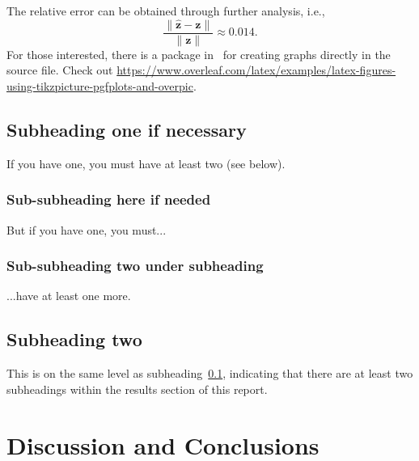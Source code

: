 \documentclass[a4paper]{article}
\begin{document}
%
%
The relative error can be obtained through further analysis, i.e.,
%
\begin{equation}
    \frac{\|\hat{\mathbf{z}}-\mathbf{z}\|}{\|\mathbf{z}\|}\approx0.014.
\end{equation}
%
%
For those interested, there is a package in \LaTeXe\ for creating graphs directly in the source file. Check out
\href{https://www.overleaf.com/latex/examples/latex-figures-using-tikzpicture-pgfplots-and-overpic/dffvyqktbcwk}{https://www.overleaf.com/latex/examples/latex-figures-using-tikzpicture-pgfplots-and-overpic}.

\subsection{Subheading one if necessary}\label{s:resultsubsection1}
If you have one, you must have at least two (see below).

\subsubsection{Sub-subheading here if needed}
But if you have one, you must...

\subsubsection{Sub-subheading two under subheading}
...have at least one more.

\subsection{Subheading two}
This is on the same level as subheading~\ref{s:resultsubsection1}, indicating that there are at least two subheadings within the results section of this report.

\newpage
\section{Discussion and Conclusions}

\end{document}
